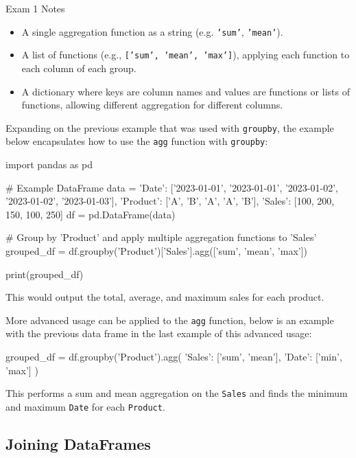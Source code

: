 \begin{examnotes}{Exam 1 Notes}
    \begin{itemize}
        \item A single aggregation function as a string (e.g. \texttt{'sum'}, \texttt{'mean'}).
        \item A list of functions (e.g., \texttt{['sum', 'mean', 'max']}), applying each function to each column of each group.
        \item A dictionary where keys are column names and values are functions or lists of functions, allowing different aggregation for different columns.
    \end{itemize}

    \begin{highlight}
        Expanding on the previous example that was used with \texttt{groupby}, the example below encapsulates how to use the \texttt{agg} function with \texttt{groupby}:

    \begin{code}[Python]
    import pandas as pd

    # Example DataFrame
    data = {
        'Date': ['2023-01-01', '2023-01-01', '2023-01-02', '2023-01-02', '2023-01-03'],
        'Product': ['A', 'B', 'A', 'A', 'B'],
        'Sales': [100, 200, 150, 100, 250]
    }
    df = pd.DataFrame(data)
    
    # Group by 'Product' and apply multiple aggregation functions to 'Sales'
    grouped_df = df.groupby('Product')['Sales'].agg(['sum', 'mean', 'max'])
    
    print(grouped_df)        
    \end{code}
    This would output the total, average, and maximum sales for each product.

    More advanced usage can be applied to the \texttt{agg} function, below is an example with the previous data frame in the last example of this advanced usage:

    \begin{code}[Python]
    grouped_df = df.groupby('Product').agg({
        'Sales': ['sum', 'mean'],
        'Date': ['min', 'max']
    })        
    \end{code}
    This performs a sum and mean aggregation on the \texttt{Sales} and finds the minimum and maximum \texttt{Date} for each \texttt{Product}.
    \end{highlight}

    \subsection*{Joining DataFrames}


\end{examnotes}
